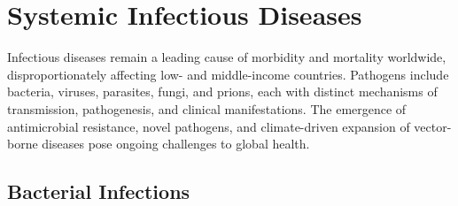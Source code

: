 \chapter{Systemic Infectious Diseases}
\label{ch:infectious}
Infectious diseases remain a leading cause of morbidity and mortality worldwide, disproportionately affecting low- and middle-income countries. Pathogens include bacteria, viruses, parasites, fungi, and prions, each with distinct mechanisms of transmission, pathogenesis, and clinical manifestations. The emergence of antimicrobial resistance, novel pathogens, and climate-driven expansion of vector-borne diseases pose ongoing challenges to global health.

\section{Bacterial Infections}








\label{sec:Bacterial Infections}

